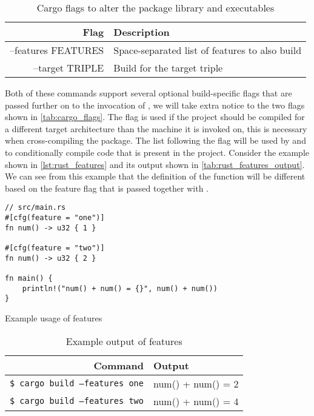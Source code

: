 \begin{table}[ht]
\begin{center}
\begin{tabular}{r|l}
\textbf{Flag} & \textbf{Description}                                   \\
\hline
--features FEATURES   & Space-separated list of features to also build \\
--target TRIPLE       & Build for the target triple                    \\
\hline
\end{tabular}
\caption{Cargo flags to alter the package library and executables}
\label{tab:cargo_flags}
\end{center}
\end{table}

Both of these commands support several optional build-specific flags that are passed further on to the invocation of {\rustc}, we will take extra notice to the two flags shown in \autoref{tab:cargo_flags}.
The  flag is used if the project should be compiled for a different target architecture than the machine it is invoked on, this is necessary when cross-compiling the package.
The list following the  flag will be used by {\cargo} and {\rustc} to conditionally compile code that is present in the project.
Consider the example shown in \autoref{lst:rust_features} and its output shown in \autoref{tab:rust_features_output}.
We can see from this example that the definition of the  function will be different based on the feature flag that is passed together with {\cargo}.

\begin{listing}[H]
\begin{verbatim}
// src/main.rs
#[cfg(feature = "one")]
fn num() -> u32 { 1 }

#[cfg(feature = "two")]
fn num() -> u32 { 2 }

fn main() {
    println!("num() + num() = {}", num() + num())
}
\end{verbatim}
\caption{Example usage of features}
\label{lst:rust_features}
\end{listing}

\begin{table}[ht]
\begin{center}
\begin{tabular}{r|l}
\textbf{Command} & \textbf{Output}                          \\
\hline
\texttt{\$ cargo build --features one}  & num() + num() = 2 \\
\texttt{\$ cargo build --features two}  & num() + num() = 4 \\
\hline
\end{tabular}
\caption{Example output of features}
\label{tab:rust_features_output}
\end{center}
\end{table}

